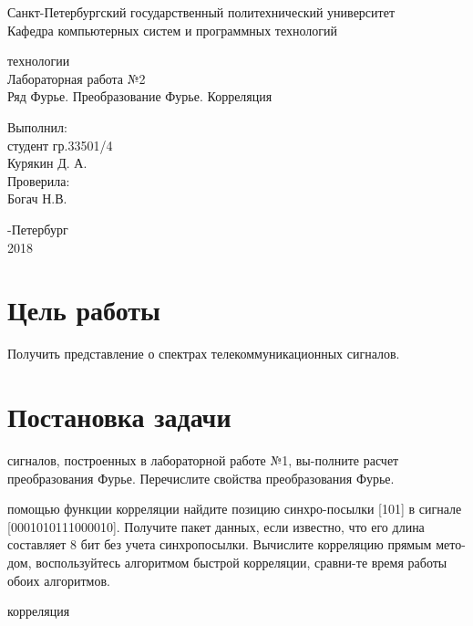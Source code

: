 \documentclass[a4paper,12pt]{article}
\begin{document}
\begin{center}
Санкт-Петербургский государственный политехнический университет
\\Кафедра компьютерных систем и программных технологий
\end{center}
\vspace*{10em plus .6em minus .5em}

\begin{center}
{ технологии
\\Лабораторная работа №2
\\Ряд Фурье. Преобразование Фурье. Корреляция}
\end{center}

\vspace*{5em plus .6em minus .5em}
\begin{flushright}
Выполнил:\\студент гр.33501/4\\Курякин Д. А.\\Проверила:\\Богач Н.В.
\end{flushright}

\vspace*{15em plus .6em minus .5em}
\begin{center}
{-Петербург
\\2018}
\end{center}
\pagestyle{empty}
\newpage
\pagestyle{plain}
\section{Цель работы}

Получить представление о спектрах телекоммуникационных сигналов.

\section{Постановка задачи}

\begin{itemize}
  сигналов, построенных в лабораторной работе №1, вы-полните расчет преобразования Фурье. Перечислите свойства преобразования Фурье.

  помощью функции корреляции найдите позицию синхро-посылки [101] в сигнале [0001010111000010]. Получите пакет данных, если известно, что его длина составляет 8 бит без учета синхропосылки. Вычислите корреляцию прямым мето-дом, воспользуйтесь алгоритмом быстрой корреляции, сравни-те время работы обоих алгоритмов.

  корреляция
\end{itemize}
\end{document}
